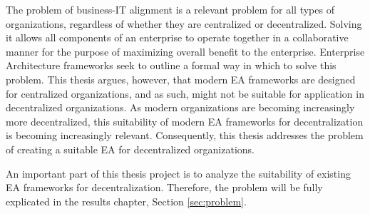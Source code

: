 The problem of business-IT alignment is a relevant problem for all types of organizations, regardless of whether they are centralized or decentralized. Solving it allows all components of an enterprise to operate together in a collaborative manner for the purpose of maximizing overall benefit to the enterprise. Enterprise Architecture frameworks seek to outline a formal way in which to solve this problem. This thesis argues, however, that modern EA frameworks are designed for centralized organizations, and as such, might not be suitable for application in decentralized organizations. As modern organizations are becoming increasingly more decentralized, this suitability of modern EA frameworks for decentralization is becoming increasingly relevant. Consequently, this thesis addresses the problem of creating a suitable EA for decentralized organizations.

An important part of this thesis project is to analyze the suitability of existing EA frameworks for decentralization. Therefore, the problem will be fully explicated in the results chapter, Section \ref{sec:problem}.
